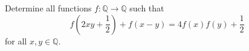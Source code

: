 Determine all functions $f: \mathbb{Q} \to \mathbb{Q}$ such that
$$f(2xy + \frac{1}{2}) + f(x-y) = 4f(x)f(y) + \frac{1}{2}$$for all $x,y \in \mathbb{Q}$.